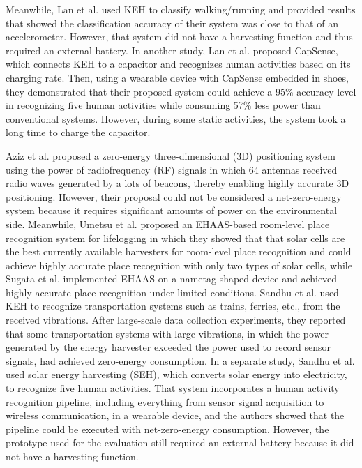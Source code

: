 \documentclass[conference]{IEEEtran}
\newcommand{\add}[1]{\textcolor{black}{#1}}	%
\newcommand{\erase}[1]{\if0{#1}\fi}	%
\begin{document}
Meanwhile, Lan et al.\cite{lan2015estimating} used KEH to classify walking/running and provided results that showed the classification accuracy of their system was close to that of an accelerometer.
However, that system did not have a harvesting function and thus required an external battery.
In another study, Lan et al. proposed CapSense\cite{lan2017capsense, lan2020capacitor}, which connects KEH to a capacitor and recognizes human activities based on its charging rate.
Then, using a wearable device with CapSense embedded in shoes, they demonstrated that their proposed system could achieve a 95\% accuracy level in recognizing five human activities while consuming 57\% less power than conventional systems.
However, during some static activities, the system took a long time to charge the capacitor. 

Aziz et al.\cite{aziz2019battery} proposed a zero-energy three-dimensional (3D) positioning system using the power of radiofrequency (RF) signals in which 64 antennas received radio waves generated by a \erase{huge} \add{lots of} beacon\add{s}, thereby enabling highly accurate 3D positioning.
However, their proposal could not be considered a net-zero-energy system because it requires significant amounts of power on the environmental side.
Meanwhile, Umetsu et al.\cite{umetsu2019ehaas} proposed an EHAAS-based\erase{,} room-level place recognition system for lifelogging in which they showed that that solar cells are the best currently available harvesters for room-level place recognition and could achieve highly accurate place recognition with only two types of solar cells, while Sugata et al.\cite{sugata2019battery} implemented EHAAS on a nametag-shaped device and achieved highly accurate place recognition under limited conditions. 
Sandhu et al.\cite{sandhu2020towards} used KEH to recognize transportation systems such as trains, ferries, etc., from the received vibrations.
After large-scale data collection experiments, they reported that some transportation systems with large vibrations, in which the power generated by the energy harvester exceeded the power used to record sensor signals, had achieved zero-energy consumption.
In a separate study, Sandhu et al.\cite{Sandhu2021SolAREP} used solar energy harvesting (SEH), which converts solar energy into electricity, to recognize five human activities.
That system incorporates a human activity recognition pipeline, including everything from sensor signal acquisition to wireless communication, in a wearable device, and the authors showed that the pipeline could be executed with net-zero-energy consumption. However, the prototype used for the evaluation still required an external battery because it did not have a harvesting function.
\end{document}
